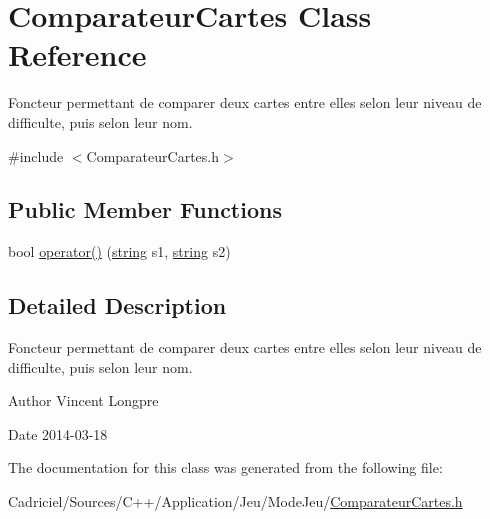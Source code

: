 \hypertarget{class_comparateur_cartes}{\section{Comparateur\-Cartes Class Reference}
\label{class_comparateur_cartes}
}


Foncteur permettant de comparer deux cartes entre elles selon leur niveau de difficulte, puis selon leur nom.  




{\ttfamily \#include $<$Comparateur\-Cartes.\-h$>$}

\subsection*{Public Member Functions}
\begin{DoxyCompactItemize}
\item 
bool \hyperlink{group__inf2990_gac15d906e204ad5bb5942d3e21af77544}{operator()} (\hyperlink{glew_8h_ae84541b4f3d8e1ea24ec0f466a8c568b}{string} s1, \hyperlink{glew_8h_ae84541b4f3d8e1ea24ec0f466a8c568b}{string} s2)
\end{DoxyCompactItemize}


\subsection{Detailed Description}
Foncteur permettant de comparer deux cartes entre elles selon leur niveau de difficulte, puis selon leur nom. 

\begin{DoxyAuthor}{Author}
Vincent Longpre 
\end{DoxyAuthor}
\begin{DoxyDate}{Date}
2014-\/03-\/18 
\end{DoxyDate}


The documentation for this class was generated from the following file\-:\begin{DoxyCompactItemize}
\item 
Cadriciel/\-Sources/\-C++/\-Application/\-Jeu/\-Mode\-Jeu/\hyperlink{_comparateur_cartes_8h}{Comparateur\-Cartes.\-h}\end{DoxyCompactItemize}
